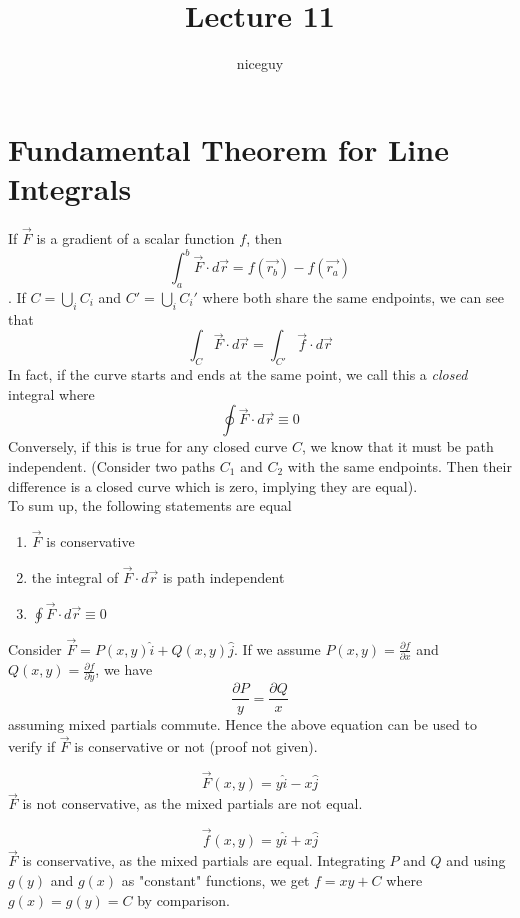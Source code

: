 \documentclass[12pt]{article}
\author{niceguy}
\title{Lecture 11}
\begin{document}
\maketitle

\section{Fundamental Theorem for Line Integrals}
If $\vec{F}$ is a gradient of a scalar function $f$, then
$$\int_a^b \vec{F} \cdot d\vec{r} = f(\vec{r_b}) - f(\vec{r_a})$$. If $C = \bigcup_i C_i$ and $C' = \bigcup_i C_i'$ where both share the same endpoints, we can see that
$$\int_C \vec{F} \cdot d\vec{r} = \int_{C'} \vec{f} \cdot d\vec{r}$$
In fact, if the curve starts and ends at the same point, we call this a \emph{closed} integral where
$$\oint \vec{F} \cdot d\vec{r} \equiv 0$$
Conversely, if this is true for any closed curve $C$, we know that it must be path independent. (Consider two paths $C_1$ and $C_2$ with the same endpoints. Then their difference is a closed curve which is zero, implying they are equal). \\
To sum up, the following statements are equal
\begin{enumerate}
	\item $\vec{F}$ is conservative
	\item the integral of $\vec{F} \cdot d\vec{r}$ is path independent
	\item $\oint \vec{F} \cdot d\vec{r} \equiv 0$
\end{enumerate}

Consider $\vec{F} = P(x,y)\hat{i} + Q(x,y)\hat{j}$. If we assume $P(x,y) = \frac{\partial f}{\partial x}$ and $Q(x,y) = \frac{\partial f}{\partial y}$, we have
$$\frac{\partial P}{y} = \frac{\partial Q}{x}$$
assuming mixed partials commute. Hence the above equation can be used to verify if $\vec{F}$ is conservative or not (proof not given).

\begin{ex}
	$$\vec{F}(x,y) = y\hat{i} - x\hat{j}$$
	$\vec{F}$ is not conservative, as the mixed partials are not equal.
\end{ex}

\begin{ex}
	$$\vec{f}(x,y) = y\hat{i} + x\hat{j}$$
	$\vec{F}$ is conservative, as the mixed partials are equal. Integrating $P$ and $Q$ and using $g(y)$ and $g(x)$ as "constant" functions, we get $f = xy + C$ where $g(x) = g(y) = C$ by comparison. 
\end{ex}
\end{document}
